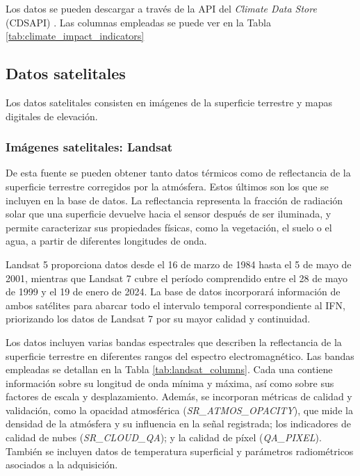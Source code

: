     Los datos se pueden descargar a través de la API del \textit{Climate Data Store} (CDSAPI) \cite{copernicus_api}. Las columnas empleadas se puede ver en la Tabla \ref{tab:climate_impact_indicators}


\subsection{Datos satelitales}
Los datos satelitales consisten en imágenes de la superficie terrestre y mapas digitales de elevación.

\subsubsection*{Imágenes satelitales: Landsat}     
    
De esta fuente se pueden obtener tanto datos térmicos como de reflectancia de la superficie terrestre corregidos por la atmósfera. Estos últimos son los que se incluyen en la base de datos. La reflectancia representa la fracción de radiación solar que una superficie devuelve hacia el sensor después de ser iluminada, y permite caracterizar sus propiedades físicas, como la vegetación, el suelo o el agua, a partir de diferentes longitudes de onda.

\medskip

Landsat 5 \cite{landsat5_data} proporciona datos desde el 16 de marzo de 1984 hasta el 5 de mayo de 2001, mientras que Landsat 7 \cite{landsat7_data} cubre el período comprendido entre el 28 de mayo de 1999 y el 19 de enero de 2024. La base de datos incorporará información de ambos satélites para abarcar todo el intervalo temporal correspondiente al IFN, priorizando los datos de Landsat 7 por su mayor calidad y continuidad.

\medskip

Los datos incluyen varias bandas espectrales que describen la reflectancia de la superficie terrestre en diferentes rangos del espectro electromagnético. Las bandas empleadas se detallan en la Tabla \ref{tab:landsat_columns}. Cada una contiene información sobre su longitud de onda mínima y máxima, así como sobre sus factores de escala y desplazamiento. Además, se incorporan métricas de calidad y validación, como la opacidad atmosférica (\textit{SR\_ATMOS\_OPACITY}), que mide la densidad de la atmósfera y su influencia en la señal registrada; los indicadores de calidad de nubes (\textit{SR\_CLOUD\_QA}); y la calidad de píxel (\textit{QA\_PIXEL}). También se incluyen datos de temperatura superficial y parámetros radiométricos asociados a la adquisición.

